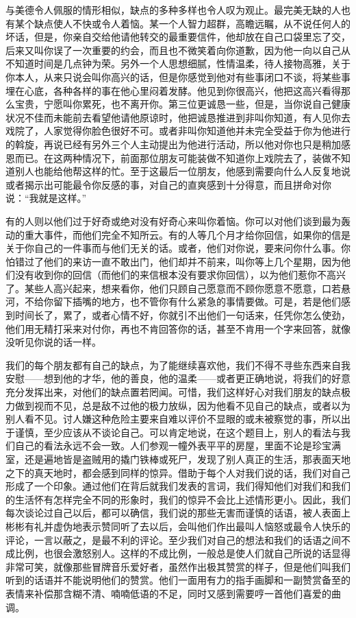 \par 与美德令人佩服的情形相似，缺点的多种多样也令人叹为观止。最完美无缺的人也有某个缺点使人不快或令人着恼。某一个人智力超群，高瞻远瞩，从不说任何人的坏话，但是，你亲自交给他请他转交的最重要信件，他却放在自己口袋里忘了交，后来又叫你误了一次重要的约会，而且也不微笑着向你道歉，因为他一向以自己从不知道时间是几点钟为荣。另外一个人思想细腻，性情温柔，待人接物高雅，关于你本人，从来只说会叫你高兴的话，但是你感觉到他对有些事闭口不谈，将某些事埋在心底，各种各样的事在他心里闷着发酵。他见到你很高兴，他把这高兴看得那么宝贵，宁愿叫你累死，也不离开你。第三位更诚恳一些，但是，当你说自己健康状况不佳而未能前去看望他请他原谅时，他把诚恳推进到非叫你知道，有人见你去戏院了，人家觉得你脸色很好不可。或者非叫你知道他并未完全受益于你为他进行的斡旋，再说已经有另外三个人主动提出为他进行活动，所以他对你也只是稍加感恩而已。在这两种情况下，前面那位朋友可能装做不知道你上戏院去了，装做不知道别人也能给他帮这样的忙。至于这最后一位朋友，他感到需要向什么人反复地说或者揭示出可能最令你反感的事，对自己的直爽感到十分得意，而且拼命对你说：“我就是这样。”
\par 有的人则以他们过于好奇或绝对没有好奇心来叫你着恼。你可以对他们谈到最为轰动的重大事件，而他们完全不知所云。有的人等几个月才给你回信，如果你的信是关于你自己的一件事而与他们无关的话。或者，他们对你说，要来问你什么事。你怕错过了他们的来访一直不敢出门，他们却并不前来，叫你等上几个星期，因为他们没有收到你的回信（而他们的来信根本没有要求你回信），以为他们惹你不高兴了。某些人高兴起来，想来看你，他们只顾自己愿意而不顾你愿意不愿意，口若悬河，不给你留下插嘴的地方，也不管你有什么紧急的事情要做。可是，若是他们感到时间长了，累了，或者心情不好，你就引不出他们一句话来，任凭你怎么使劲，他们用无精打采来对付你，再也不肯回答你的话，甚至不肯用一个字来回答，就像没听见你说的话一样。
\par 我们的每个朋友都有自己的缺点，为了能继续喜欢他，我们不得不寻些东西来自我安慰——想到他的才华，他的善良，他的温柔——或者更正确地说，将我们的好意充分发挥出来，对他们的缺点置若罔闻。可惜，我们这样好心对我们朋友的缺点极力做到视而不见，总是敌不过他的极力放纵，因为他看不见自己的缺点，或者以为别人看不见。讨人嫌这种危险主要来自难以评价不显眼的或未被察觉的事，所以出于谨慎，至少应该从不谈论自己。可以肯定地说，在这个题目上，别人的看法与我们自己的看法永远不会一致。人们参观一幢外表平平的房屋，里面不论是珍宝满室，还是遍地皆是盗贼用的撬门铁棒或死尸，发现了别人真正的生活，那表面天地之下的真天地时，都会感到同样的惊异。借助于每个人对我们说的话，我们对自己形成了一个印象。通过他们在背后就我们发表的言词，我们得知他们对我们和我们的生活怀有怎样完全不同的形象时，我们的惊异不会比上述情形更小。因此，我们每次谈论过自己以后，都可以确信，我们说的那些无害而谨慎的话语，被人表面上彬彬有礼并虚伪地表示赞同听了去以后，会叫他们作出最叫人恼怒或最令人快乐的评论，一言以蔽之，是最不利的评论。至少我们对自己的想法和我们的话语之间不成比例，也很会激怒别人。这样的不成比例，一般总是使人们就自己所说的话显得非常可笑，就像那些冒牌音乐爱好者，虽然作出极其赞赏的样子，但是他们叫我们听到的话语并不能说明他们的赞赏。他们一面用有力的指手画脚和一副赞赏备至的表情来补偿那含糊不清、喃喃低语的不足，同时又感到需要哼一首他们喜爱的曲调。
